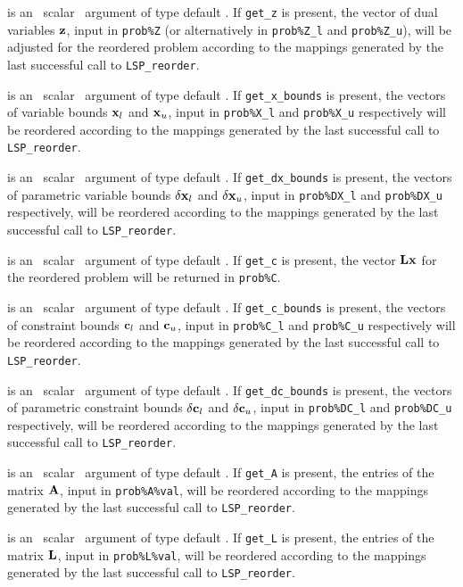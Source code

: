 \documentclass{galahad}
\newcommand{\packagename}{LSP}
\begin{document}
\begin{description}
is an \optional\ scalar \intentin\ argument of type default \logical. 
If {\tt get\_z} is present, the vector of dual variables ${\mathbf{z}}$, input in 
{\tt prob\%Z} (or alternatively in {\tt prob\%Z\_l} and {\tt prob\%Z\_u}),
will be adjusted for the reordered problem according 
to the mappings generated by the last successful 
call to {\tt \packagename\_reorder}. 
 
is an \optional\ scalar \intentin\ argument of type default \logical. 
If {\tt get\_x\_bounds} is present, 
the vectors of variable bounds ${\mathbf{x}}_l$ and 
${\mathbf{x}}_u$, input in {\tt prob\%X\_l} and {\tt prob\%X\_u} respectively
will be reordered according to the 
mappings generated by the last successful call to {\tt \packagename\_reorder}. 
 
is an \optional\ scalar \intentin\ argument of type default \logical. 
If {\tt get\_dx\_bounds} is present, 
the vectors of parametric variable bounds $\delta {\mathbf{x}}_l$ and 
$\delta {\mathbf{x}}_u$, input in {\tt prob\%DX\_l} and {\tt prob\%DX\_u} respectively,
will be reordered according to the 
mappings generated by the last successful call to {\tt \packagename\_reorder}. 
 
is an \optional\ scalar \intentin\ argument of type default \logical. 
If {\tt get\_c} is present, the vector ${\mathbf{L}} {\mathbf{x}}$ for the reordered problem 
will be returned in {\tt prob\%C}. 
 
is an \optional\ scalar \intentin\ argument of type default \logical. 
If {\tt get\_c\_bounds} is present, 
the vectors of constraint bounds ${\mathbf{c}}_l$ and 
${\mathbf{c}}_u$, input in {\tt prob\%C\_l} and {\tt prob\%C\_u} respectively
will be reordered according to the 
mappings generated by the last successful call to {\tt \packagename\_reorder}. 
 
is an \optional\ scalar \intentin\ argument of type default \logical. 
If {\tt get\_dc\_bounds} is present, 
the vectors of parametric constraint bounds $\delta {\mathbf{c}}_l$ and 
$\delta {\mathbf{c}}_u$, input in {\tt prob\%DC\_l} and {\tt prob\%DC\_u} respectively,
will be reordered according to the 
mappings generated by the last successful call to {\tt \packagename\_reorder}. 
 
is an \optional\ scalar \intentin\ argument of type default \logical. 
If {\tt get\_A} is present, the entries of the 
matrix ${\mathbf{A}}$, input in {\tt prob\%A\%val}, will be reordered according to the 
mappings generated by the last successful call to {\tt \packagename\_reorder}. 
 
is an \optional\ scalar \intentin\ argument of type default \logical. 
If {\tt get\_L} is present, the entries of the 
matrix ${\mathbf{L}}$, input in {\tt prob\%L\%val}, will be reordered according to the 
mappings generated by the last successful call to {\tt \packagename\_reorder}. 
 
\end{description}
\end{document}
